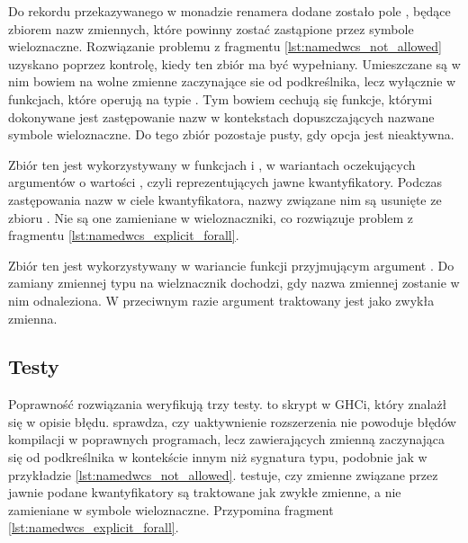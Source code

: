 Do rekordu  przekazywanego w monadzie renamera dodane zostało pole , będące zbiorem nazw zmiennych, które powinny zostać zastąpione przez symbole wieloznaczne. Rozwiązanie problemu z fragmentu \ref{lst:namedwcs_not_allowed} uzyskano poprzez kontrolę, kiedy ten zbiór ma być wypełniany. Umieszczane są w nim bowiem na wolne zmienne zaczynające sie od podkreślnika, lecz wyłącznie w funkcjach, które operują na typie . Tym bowiem cechują się funkcje, którymi dokonywane jest zastępowanie nazw w kontekstach dopuszczających nazwane symbole wieloznaczne. Do tego zbiór pozostaje pusty, gdy opcja  jest nieaktywna.

Zbiór ten jest wykorzystywany w funkcjach  i , w wariantach oczekujących argumentów o wartości , czyli reprezentujących jawne kwantyfikatory. Podczas zastępowania nazw w ciele kwantyfikatora, nazwy związane nim są usunięte ze zbioru . Nie są one zamieniane w wieloznaczniki, co rozwiązuje problem z fragmentu \ref{lst:namedwcs_explicit_forall}.

Zbiór ten jest wykorzystywany w wariancie funkcji  przyjmującym argument . Do zamiany zmiennej typu na wielznacznik dochodzi, gdy nazwa zmiennej zostanie w nim odnaleziona. W przeciwnym razie argument traktowany jest jako zwykła zmienna.

\subsection{Testy} %

Poprawność rozwiązania weryfikują trzy testy.  to skrypt w GHCi, który znalażł się w opisie błędu.  sprawdza, czy uaktywnienie rozszerzenia  nie powoduje błędów kompilacji w poprawnych programach, lecz zawierających zmienną zaczynająca się od podkreślnika w kontekście innym niż sygnatura typu, podobnie jak w przykładzie \ref{lst:namedwcs_not_allowed}.  testuje, czy zmienne związane przez jawnie podane kwantyfikatory są traktowane jak zwykłe zmienne, a nie zamieniane w symbole wieloznaczne. Przypomina fragment \ref{lst:namedwcs_explicit_forall}.
